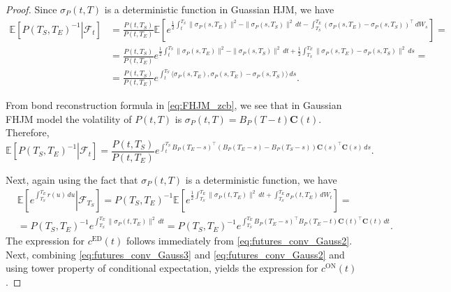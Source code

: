 \documentclass[pdftex,11pt,a4paper] {article}
\begin{document}
\begin{proof}
Since $\sigma_P(t,T)$ is a deterministic function in Guassian HJM, we have
\begin{equation*}
\begin{split}
\mathbb{E}\left[\left.P(T_S,T_E)^{-1}\right|\mathcal{F}_t\right]&=
\frac{P(t,T_S)}{P(t,T_E)}\mathbb{E}\left[e^{\frac{1}{2}\int_{t}^{T_S}\|\sigma_P(s,T_E)\|^2-\|\sigma_P(s,T_S)\|^2\,dt-\int_{T_S}^{T_E}\left(\sigma_P(s,T_E)-\sigma_P(s,T_S)\right)^\top\,dW_s}\right]=\\
&=\frac{P(t,T_S)}{P(t,T_E)}e^{\frac{1}{2}\int_{t}^{T_S}\|\sigma_P(s,T_E)\|^2-\|\sigma_P(s,T_S)\|^2\,dt+\frac{1}{2}\int_{T_S}^{T_E}\|\sigma_P(s,T_E)-\sigma_P(s,T_S)\|^2\,ds}=\\
&=\frac{P(t,T_S)}{P(t,T_E)}e^{\int_{t}^{T_S}\langle \sigma_P(s,T_E), \sigma_P(s,T_E)-\sigma_P(s,T_S)\rangle\,ds}.
\end{split}
\end{equation*}

From bond reconstruction formula in \eqref{eq:FHJM_zcb}, we see that in Gaussian FHJM model the volatility of $P(t,T)$ is $\sigma_P(t,T)=B_P(T-t)\mathbf{C}(t)$. Therefore,
\begin{equation}\label{eq:futures_conv_Gauss2}
\mathbb{E}\left[\left.P(T_S,T_E)^{-1}\right|\mathcal{F}_t\right]=
\frac{P(t,T_S)}{P(t,T_E)}e^{\int_{t}^{T_S}B_P(T_E-s)^\top\left(B_P(T_E-s)-B_P(T_S-s)\right)\mathbf{C}(s)^\top\mathbf{C}(s)\,ds}.
\end{equation}

Next, again using the fact that $\sigma_P(t,T)$ is a deterministic function, we have
\begin{equation}\label{eq:futures_conv_Gauss3}
\begin{split}
&\mathbb{E}\left[\left.e^{\int_{T_S}^{T_E}r(u)\,du}\right|\mathcal{F}_{T_S}\right]=
P(T_S,T_E)^{-1}\mathbb{E}\left[e^{\frac{1}{2}\int_{T_S}^{T_E}\|\sigma_P(t,T_E)\|^2\,dt+\int_{T_S}^{T_E}\sigma_P(t,T_E)\,dW_t}\right]=\\
&=P(T_S,T_E)^{-1}e^{\int_{T_S}^{T_E}\|\sigma_P(t,T_E)\|^2\,dt}=
P(T_S,T_E)^{-1}e^{\int_{T_S}^{T_E}B_P(T_E-s)^\top B_P(T_E-t)\mathbf{C}(t)^\top\mathbf{C}(t)\,dt}.
\end{split}
\end{equation}
The expression for $c^{\mathrm{ED}}(t)$ follows immediately from \eqref{eq:futures_conv_Gauss2}. Next, combining \eqref{eq:futures_conv_Gauss3} and \eqref{eq:futures_conv_Gauss2} and using tower property of conditional expectation, yields the expression for $c^{\mathrm{ON}}(t)$. 

\end{proof}
\end{document}
